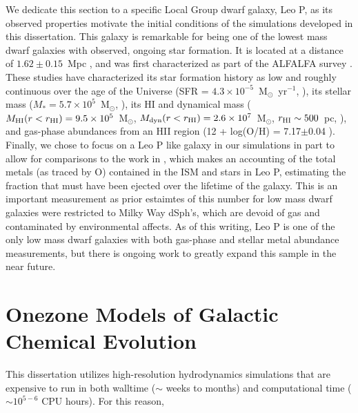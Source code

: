 We dedicate this section to a specific Local Group dwarf galaxy, Leo P, as its observed properties motivate the initial conditions of the simulations developed in this dissertation. This galaxy is remarkable for being one of the lowest mass dwarf galaxies with observed, ongoing star formation. It is located at a distance of $1.62\pm 0.15$~Mpc \citep{McQuinn2015a}, and was first characterized as part of the ALFALFA survey \citep{Giovanelli2013,Rhode2013,Skillman2013,McQuinn2013,Bernstein-Cooper2014}. These studies have characterized its star formation history as low and roughly continuous over the age of the Universe (SFR = $4.3\times 10^{-5}$~M$_{\odot}$~yr$^{-1}$, \cite{McQuinn2015a}), its stellar mass ($M_{*} = 5.7 \times 10^{5}$~M$_{\odot}$, \cite{McQuinn2013}), its HI and dynamical mass ($M_{\rm HI}(r<r_{\rm HI}) = 9.5\times 10^{5}$~M$_{\odot}$, $M_{\rm dyn}(r<r_{\rm HI}) = 2.6 \times 10^{7}$~M$_{\odot}$, $r_{\rm HI} \sim 500$~pc, \cite{Bernstein-Cooper2014}), and gas-phase abundances from an HII region (12 + log(O/H) = 7.17$\pm$0.04 \cite{Skillman2013}). Finally, we chose to focus on a Leo P like galaxy in our simulations in part to allow for comparisons to the work in \cite{McQuinn2015}, which makes an accounting of the total metals (as traced by O) contained in the ISM and stars in Leo P, estimating the fraction that must have been ejected over the lifetime of the galaxy. This is an important measurement as prior estaimtes of this number for low mass dwarf galaxies were restricted to Milky Way dSph's, which are devoid of gas and contaminated by environmental affects. As of this writing, Leo P is one of the only low mass dwarf galaxies with both gas-phase and stellar metal abundance measurements, but there is ongoing work to greatly expand this sample in the near future.

\section{Onezone Models of Galactic Chemical Evolution}
\label{intro:sec:onezone}

This dissertation utilizes high-resolution hydrodynamics simulations that are expensive to run in both walltime ($\sim$ weeks to months) and computational time ($\sim 10^{5-6}$ CPU hours). For this reason, 

